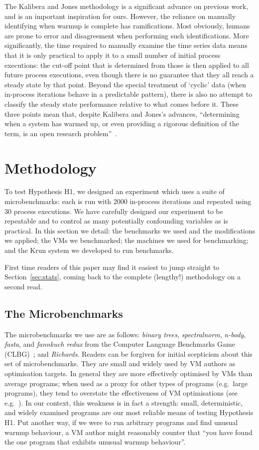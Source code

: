 \documentclass[acmsmall]{acmart}\settopmatter{printfolios=true}
\newcommand{\kalibera}{Kalibera and Jones\xspace}
\newcommand{\krun}{Krun\xspace}
\newcommand{\hypone}{H1\xspace}
\newcommand{\binarytrees}{\emph{binary trees}\xspace}
\newcommand{\richards}{\emph{Richards}\xspace}
\newcommand{\spectralnorm}{\emph{spectralnorm}\xspace}
\newcommand{\nbody}{\emph{n-body}\xspace}
\newcommand{\fasta}{\emph{fasta}\xspace}
\newcommand{\fannkuch}{\emph{fannkuch redux}\xspace}
\newcommand{\numpexecs}{30\xspace}
\newcommand{\numiterations}{2000\xspace}
\begin{document}
The \kalibera methodology is a significant advance on previous work,
and is an important inspiration for ours. However, the reliance
on manually identifying when warmup is complete has ramifications. Most
obviously, humans are prone to error and disagreement when performing
such identifications. More significantly, the time required
to manually examine the time series data means that it is only practical to apply it to a small number
of initial process executions: the cut-off point that is determined from those
is then applied to all future process executions, even though there is no
guarantee that they all reach a steady state by that point. Beyond the
special treatment of `cyclic' data (when in-process iterations behave in a
predictable pattern), there is also no attempt to classify the steady state
performance relative to what comes before it. These three points mean that,
despite \kalibera's advances,
``determining when a system has warmed up, or even providing a
rigorous definition of the term, is an open research problem''~\cite{seaton15phd}.


\section{Methodology}
\label{sec:methodology}

To test Hypothesis \hypone, we designed an experiment which uses a suite of
microbenchmarks: each is run with \numiterations in-process iterations and repeated
using \numpexecs process executions. We have carefully designed our
experiment to be repeatable and to control as many potentially confounding variables as
is practical. In this section we detail: the benchmarks we used and the modifications we
applied; the VMs we benchmarked; the machines we used for benchmarking; and the
\krun system we developed to run benchmarks.

First time readers of this paper may find it easiest to jump straight to
Section~\ref{sec:stats}, coming back to the complete (lengthy!) methodology
on a second read.


\subsection{The Microbenchmarks}
\label{sec:microbenchmarks}

The microbenchmarks we use are as follows: \binarytrees, \spectralnorm, \nbody,
\fasta, and \fannkuch from the Computer Language Benchmarks Game (CLBG)~\cite{clbg}; and
\richards. Readers can be forgiven for initial scepticism about this set of microbenchmarks.
They are small and widely
used by VM authors as optimisation targets. In general they are more effectively
optimised by VMs than average programs; when used as a proxy for other types
of programs (e.g.~large programs), they tend to overstate the effectiveness of
VM optimisations (see e.g.~\cite{ratanaworabhan09jsmeter}). In our context, this weakness is in fact a strength:
small, deterministic, and widely examined programs are our most
reliable means of testing Hypothesis \hypone. Put another way, if we were to run arbitrary programs
and find unusual warmup behaviour, a VM author might reasonably counter that
``you have found the one program that exhibits unusual warmup behaviour''.
\end{document}
